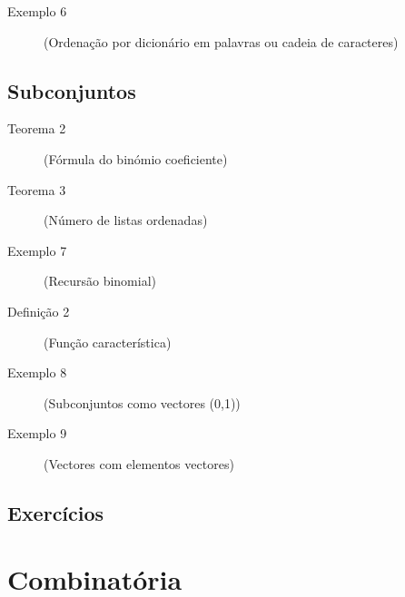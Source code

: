 \begin{description}
	\item[Exemplo 6] (Ordenação por dicionário em palavras ou cadeia de caracteres)
\end{description}

\subsection{Subconjuntos}

\begin{description}
	\item[Teorema 2] (Fórmula do binómio coeficiente)
\end{description}

\begin{description}
	\item[Teorema 3] (Número de listas ordenadas)
\end{description}

\begin{description}
	\item[Exemplo 7] (Recursão binomial)
\end{description}


\begin{description}
	\item[Definição 2] (Função característica)
\end{description}

\begin{description}
	\item[Exemplo 8] (Subconjuntos como vectores (0,1))
\end{description}

\begin{description}
	\item[Exemplo 9] (Vectores com elementos vectores)
\end{description}


\subsection{Exercícios}

\section{Combinatória}
